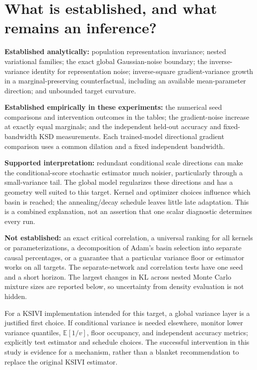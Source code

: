 \documentclass[11pt,a4paper]{article}
\numberwithin{equation}{section}
\newcommand{\E}{\mathbb E}
\begin{document}
\section{What is established, and what remains an inference?}
\textbf{Established analytically:} population representation invariance;
nested variational families; the exact global Gaussian-noise boundary;
the inverse-variance identity for representation noise; inverse-square
gradient-variance growth in a marginal-preserving counterfactual, including
an available mean-parameter direction; and unbounded target curvature.

\textbf{Established empirically in these experiments:} the numerical seed
comparisons and intervention outcomes in the tables; the gradient-noise
increase at exactly equal marginals; and the independent held-out accuracy
and fixed-bandwidth KSD measurements. Each trained-model directional gradient
comparison uses a common dilation and a fixed independent bandwidth.

\textbf{Supported interpretation:} redundant conditional scale directions
can make the conditional-score stochastic estimator much noisier, particularly
through a small-variance tail. The global model regularizes these directions
and has a geometry well suited to this target. Kernel and optimizer choices
influence which basin is reached; the annealing/decay schedule leaves little
late adaptation. This is a combined explanation, not an assertion that one
scalar diagnostic determines every run.

\textbf{Not established:} an exact critical correlation, a universal ranking
for all kernels or parameterizations, a decomposition of Adam's basin
selection into separate causal percentages, or a guarantee that a particular
variance floor or estimator works on all targets. The separate-network and
correlation tests have one seed and a short horizon. The largest changes in
KL across nested Monte Carlo mixture sizes are reported below, so uncertainty
from density evaluation is not hidden.

For a KSIVI implementation intended for this target, a global variance layer
is a justified first choice. If conditional variance is needed elsewhere,
monitor lower variance quantiles, $\E[1/v]$, floor occupancy, and independent
accuracy metrics; explicitly test estimator and schedule choices. The
successful intervention in this study is evidence for a mechanism, rather
than a blanket recommendation to replace the original KSIVI estimator.
\end{document}
